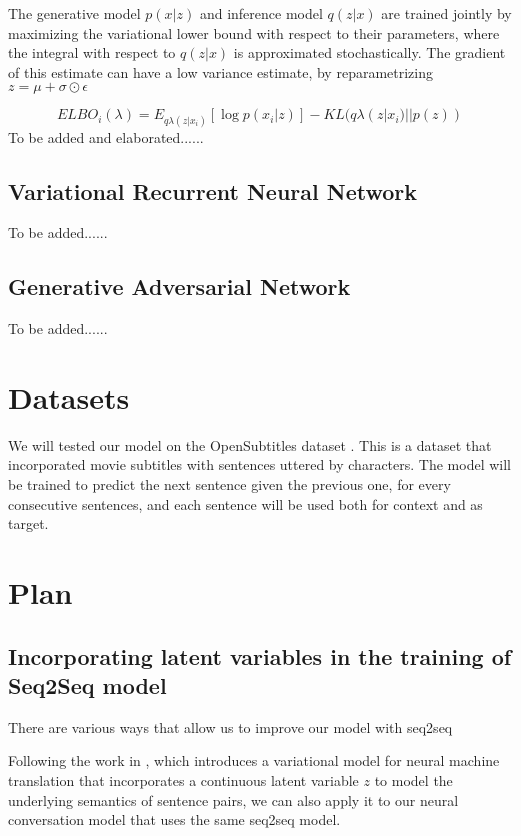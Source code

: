 \documentclass{article}
\begin{document}
The generative model $p(x|z)$ and inference model $q(z|x)$ are trained jointly by maximizing the variational lower bound with respect to their parameters, where the integral with respect to $q(z|x)$ is approximated stochastically. The gradient of this estimate can have a low variance estimate, by reparametrizing $z = \mu+\sigma\odot\epsilon$

$$ELBO_i (\lambda) = E_{q\lambda (z|x_i)}[\log p(x_i|z)]-KL(q\lambda (z|x_i)||p(z))$$ 
To be added and elaborated......


\subsection{Variational Recurrent Neural Network}
\cite{vrnn} 
To be added......

\subsection{Generative Adversarial Network} 
\cite{gan} 
 
\cite{ganncm} 
To be added...... 

\section{Datasets}

We will tested our model on the OpenSubtitles
dataset \cite{opensubtitle}. This is a dataset that incorporated movie subtitles with sentences uttered by characters.
The model will be trained to predict the next sentence given the previous one, for every consecutive sentences, and each sentence will be used both for context and as target.

 

\section{Plan}

\subsection{Incorporating latent variables in the training of Seq2Seq model}
There are various ways that allow us to improve our model with seq2seq 

Following the work in \cite{vnmt}, which introduces a variational model for neural machine translation that incorporates a continuous latent variable $z$ to model the underlying semantics of sentence pairs, we can also apply it to our neural conversation model that uses the same seq2seq model. 
\end{document}
